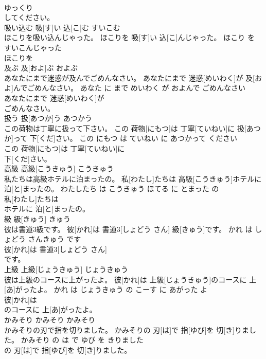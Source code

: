 \documentclass[8pt]{extreport}
\begin{document}
\begin{CJK}{UTF8}{min}
\\	ゆっくり
\\	してください。			
\\	吸い込む	吸[す]い 込[こ]む	すいこむ	
\\	ほこりを吸い込んじゃった。	ほこりを 吸[す]い 込[こ]んじゃった。	ほこり を すいこんじゃった	
\\	ほこりを
\\	及ぶ	及[およ]ぶ	およぶ	
\\	あなたにまで迷惑が及んでごめんなさい。	あなたにまで 迷惑[めいわく]が 及[およ]んでごめんなさい。	あなた に まで めいわく が およんで ごめんなさい	
\\	あなたにまで 迷惑[めいわく]が
\\	ごめんなさい。			
\\	扱う	扱[あつか]う	あつかう	
\\	この荷物は丁寧に扱って下さい。	この 荷物[にもつ]は 丁寧[ていねい]に 扱[あつか]って 下[くだ]さい。	この にもつ は ていねい に あつかって ください	
\\	この 荷物[にもつ]は 丁寧[ていねい]に
\\	下[くだ]さい。			
\\	高級	高級[こうきゅう]	こうきゅう	
\\	私たちは高級ホテルに泊まったの。	私[わたし]たちは 高級[こうきゅう]ホテルに 泊[と]まったの。	わたしたち は こうきゅう ほてる に とまった の	
\\	私[わたし]たちは
\\	ホテルに 泊[と]まったの。			
\\	級	級[きゅう]	きゅう	
\\	彼は書道3級です。	彼[かれ]は 書道3[しょどう さん] 級[きゅう]です。	かれ は しょどう さんきゅう です	
\\	彼[かれ]は 書道3[しょどう さん]
\\	です。			
\\	上級	上級[じょうきゅう]	じょうきゅう	
\\	彼は上級のコースに上がったよ。	彼[かれ]は 上級[じょうきゅう]のコースに 上[あ]がったよ。	かれ は じょうきゅう の こーす に あがった よ	
\\	彼[かれ]は
\\	のコースに 上[あ]がったよ。			
\\	かみそり	かみそり	かみそり	
\\	かみそりの刃で指を切りました。	かみそりの 刃[は]で 指[ゆび]を 切[き]りました。	かみそり の は で ゆび を きりました	
\\	の 刃[は]で 指[ゆび]を 切[き]りました。			

\end{CJK}
\end{document}

